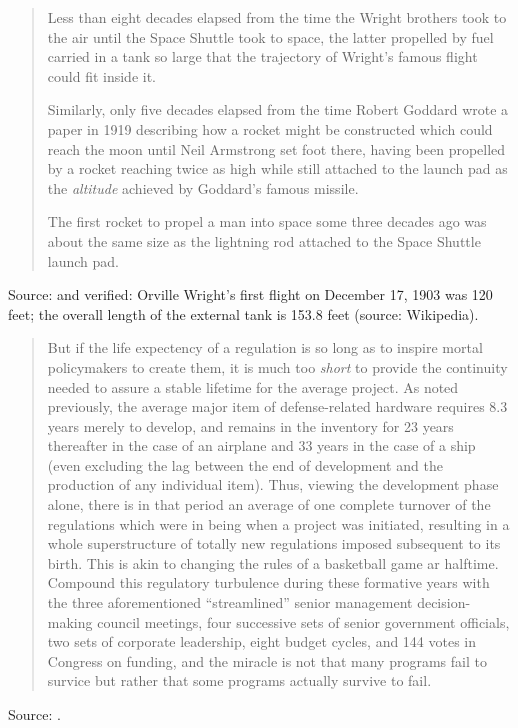 \documentclass[a4paper]{article}
\begin{document}
\begin{quotation}
	Less than eight decades elapsed from the time the Wright brothers
	took to the air until the Space Shuttle took to space, the latter
	propelled by fuel carried in a tank so large that the trajectory
	of Wright's famous flight could fit inside it.

	Similarly, only five decades elapsed from the time Robert Goddard
	wrote a paper in 1919 describing how a rocket might be constructed
	which could reach the moon until Neil Armstrong set foot there,
	having been propelled by a rocket reaching twice as high while
	still attached to the launch pad as the \emph{altitude} achieved
	by Goddard's famous missile.

	The first rocket to propel a man into space some three decades ago
	was about the same size as the lightning rod attached to the Space
	Shuttle launch pad.
\end{quotation}
Source: \citet[p.~347 (emphasis in original)]{Augustine1997} and
verified: Orville Wright's first flight on December 17, 1903 was 120
feet; the overall length of the external tank is 153.8 feet (source:
Wikipedia).
\medskip

\begin{quote}
	But if the life expectency of a regulation is so long as to inspire
	mortal policymakers to create them, it is much too \emph{short} to
	provide the continuity needed to assure a stable lifetime for the
	average project.  As noted previously, the average major item of
	defense-related hardware requires 8.3 years merely to develop, and
	remains in the inventory for 23 years thereafter in the case of an
	airplane and 33 years in the case of a ship (even excluding the lag
	between the end of development and the production of any individual
	item).  Thus, viewing the development phase alone, there is in that
	period an average of one complete turnover of the regulations which
	were in being when a project was initiated, resulting in a whole
	superstructure of totally new regulations imposed subsequent to its
	birth.  This is akin to changing the rules of a basketball game ar
	halftime.  Compound this regulatory turbulence during these formative
	years with the three aforementioned ``streamlined'' senior management
	decision-making council meetings, four successive sets of senior
	government officials, two sets of corporate leadership, eight budget
	cycles, and 144 votes in Congress on funding, and the miracle is not
	that many programs fail to survice but rather that some programs
	actually survive to fail.
\end{quote}
Source: \citet[p.~334--5]{Augustine1997}.
\medskip
\end{document}
